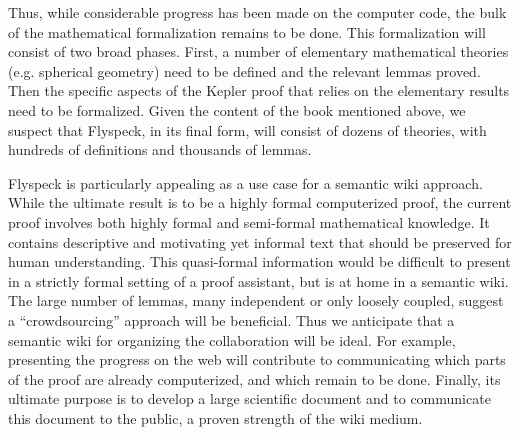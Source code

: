 Thus, while
considerable progress has been made on the computer code, the bulk of
the mathematical formalization remains to be done.  This formalization
will consist of two broad phases.  First, a number of elementary
mathematical theories (e.g. spherical geometry) need to be defined and
the relevant lemmas proved.  Then the specific aspects of the Kepler
proof that relies on the elementary results need to be formalized.
Given the content of the book mentioned above, we suspect that
Flyspeck, in its final form, will consist of dozens of theories, with
hundreds of definitions and thousands of lemmas.

Flyspeck is particularly appealing as a use case for a semantic wiki
approach. While the ultimate result is to be a highly formal
computerized proof, the current proof involves both highly formal and
semi-formal mathematical knowledge.  It contains descriptive and
motivating yet informal text that should be preserved for human
understanding.  This quasi-formal information would be difficult to
present in a strictly formal setting of a proof assistant, but is at
home in a semantic wiki.  The large number of lemmas, many independent
or only loosely coupled, suggest a ``crowdsourcing'' approach will be
beneficial. Thus we anticipate that a semantic wiki for organizing the
collaboration will be ideal.  For example, presenting the progress on
the web will contribute to communicating which parts of the proof are
already computerized, and which remain to be done.  Finally, its
ultimate purpose is to develop a large scientific document and to
communicate this document to the public, a proven strength of 
the wiki medium.

